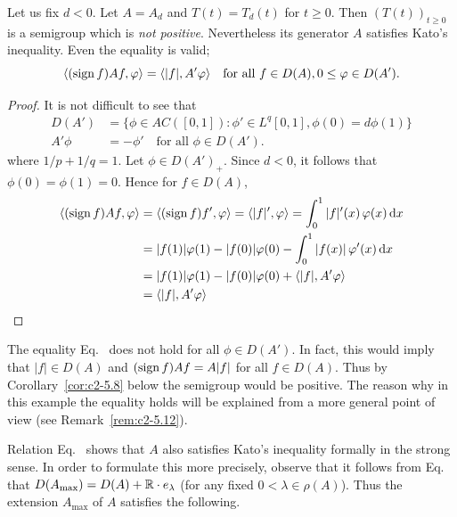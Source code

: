 Let us fix $d < 0$. Let $A = A_{d}$ and $T(t) = T_{d}(t)$ for $t \geq 0$. Then
$(T(t))_{t \geq 0}$ is a semigroup which is \emph{not positive}. Nevertheless its generator $A$ satisfies Kato's inequality. Even the equality is valid;
\ie
\begin{equation}\label{eq:c2-3.10}
\langle(\sign  f) Af,\phi\rangle = \langle|f|,A'\phi \rangle \quad \text{for all } f \in D(A), 0 \leq \phi \in D(A'). 
\end{equation}
\begin{proof}
It is not difficult to see that
\begin{equation}\label{eq:c2-3.11}
\begin{array}{rl}
D(A') &= \{\phi \in AC([0,1]) \colon \phi' \in L^{q}[0,1], \phi(0) = d\phi(1)\}\\ 
A'\phi &= -\phi' \quad \text{for all } \phi \in D(A').
\end{array}
\end{equation}
where $1/p + 1/q = 1$. Let $\phi \in D(A')_{+}$. 
Since $d < 0$, it follows that $\phi(0) = \phi(1) = 0$. 
Hence for $f \in D(A)$,
\begin{align*}
\langle(\sign  f)Af,\phi\rangle &= \langle(\sign  f)f',\phi\rangle = \langle|f|',\phi\rangle 
= \int_{0}^{1} |f|'(x) \, \phi(x) \dx\\
&= |f(1)|\phi(1) - |f(0)|\phi(0) - \int_{0}^{1} |f(x)| \, \phi'(x) \dx\\
&= |f(1)|\phi(1) - |f(0)|\phi(0) + \langle|f|,A'\phi\rangle\\
&= \langle|f|,A'\phi\rangle
\tag*{\qedsymbol}%
\end{align*}
\let\qedsymbol\relax
\end{proof}
\begin{remark}\label{rem:c2-3.15}
The equality Eq.~ does not hold for all $\phi \in D(A')$. 
In fact, this would imply that $|f| \in D(A)$ and $(\operatorname{sign}  f)Af = A|f|$ for
all $f \in D(A)$. 
Thus by Corollary~\ref{cor:c2-5.8}
below the semigroup would be positive. 
The reason why in this example the equality holds will be explained from a more general point of view 
(see Remark~\ref{rem:c2-5.12}).
\end{remark}
Relation Eq.~ shows that $A$ also satisfies Kato's inequality
formally in the strong sense. 
In order to formulate this more precisely, observe that it follows from Eq.~ that $D(A_{\max}) = D(A) + \mathbb{R} \cdot e_{\lambda}$ (for any fixed $0 < \lambda \in \rho(A)$). Thus the extension $A_{\max}$ of\/ $A$ satisfies the following.
